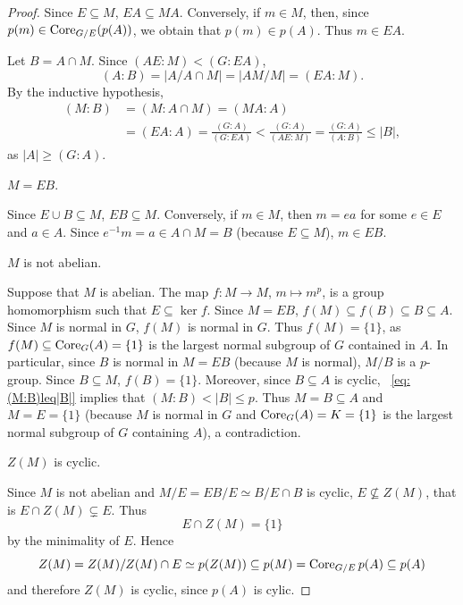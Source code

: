\begin{proof}
	Since $E\subseteq M$, $EA\subseteq MA$. Conversely, if $m\in M$, 
	then, since $p(m)\in\operatorname{Core}_{G/E}(p(A))$, we obtain that 
	$p(m)\in p(A)$. Thus $m\in EA$. 

	\medskip
	Let $B=A\cap M$. Since $(AE:M)<(G:EA)$, 
	\[
	(A:B)=|A/A\cap M|=|AM/M|=(EA:M).
	\]
	By the inductive hypothesis, 
	\begin{equation}
		\label{eq:(M:B)leq|B|}
	\begin{aligned}
		(M:B)&=(M:A\cap M)=(MA:A)\\
		&=(EA:A)
		=\frac{(G:A)}{(G:EA)}
		<\frac{(G:A)}{(AE:M)}
		=\frac{(G:A)}{(A:B)}\leq |B|, 
	\end{aligned}
	\end{equation}
	as $|A|\geq (G:A)$. 

	\begin{claim}
		$M=EB$.
	\end{claim}

	Since $E\cup B\subseteq M$, $EB\subseteq M$. Conversely, if 
	$m\in M$, then $m=ea$ for some $e\in E$ and $a\in A$. Since $e^{-1}m=a\in
	A\cap M=B$ (because $E\subseteq M$), $m\in EB$.

	\begin{claim}
		$M$ is not abelian. 
	\end{claim}

	Suppose that $M$ is abelian. The map $f\colon M\to M$, $m\mapsto
	m^p$, is a group homomorphism such that $E \subseteq\ker f$. Since $M=EB$,
	$f(M)\subseteq f(B)\subseteq B\subseteq A$. Since $M$ is normal in $G$,
	$f(M)$ is normal in $G$. Thus $f(M)=\{1\}$, as $f(M)\subseteq\operatorname{Core}_G(A)=\{1\}$ is the largest normal subgroup of $G$ contained in $A$. In particular, since $B$ is normal in $M=EB$ (because $M$ is normal), $M/B$ is a $p$-group. Since $B\subseteq M$,  $f(B)=\{1\}$. Moreover, since 
	$B\subseteq A$ is cyclic, ~\eqref{eq:(M:B)leq|B|} implies that  
	$(M:B)<|B|\leq p$. Thus $M=B\subseteq A$ and $M=E=\{1\}$ (because 
	$M$ is normal in $G$ and $\operatorname{Core}_G(A)=K=\{1\}$ is the largest normal subgroup of $G$ containing $A$), a contradiction. 
	
	\begin{claim}
		$Z(M)$  is cyclic. 
	\end{claim}

	Since $M$ is not abelian and $M/E=EB/E\simeq B/E\cap B$ is cyclic,
	$E\not\subseteq Z(M)$, that is $E\cap
	Z(M)\subsetneq E$. Thus  
	\begin{equation}
		\label{equation:EcapZ(M)}
		E\cap Z(M)=\{1\}
	\end{equation}
	by the minimality of $E$. Hence  
	\[
	Z(M)=Z(M)/Z(M)\cap E\simeq p(Z(M))\subseteq p(M)=\operatorname{Core}_{G/E}p(A)\subseteq p(A)
	\]
	and therefore $Z(M)$ is cyclic, since $p(A)$ is cylic. 


\end{proof}
